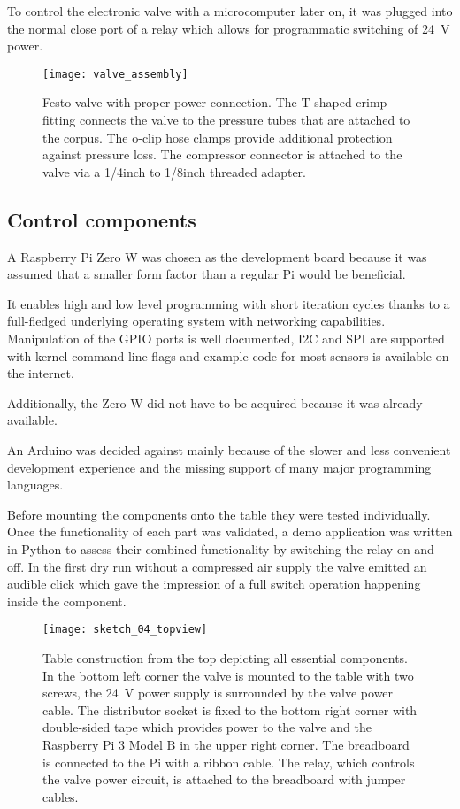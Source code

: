 To control the electronic valve with a microcomputer later on, it was plugged into the normal close port of a relay which allows for programmatic switching of \SI{24}{\volt} power. 

\begin{figure}[H]
\centering

\texttt{[image: valve\_assembly]}

\caption{Festo valve with proper power connection. The T-shaped crimp fitting connects the valve to the pressure tubes that are attached to the corpus. The o-clip hose clamps provide additional protection against pressure loss. The compressor connector is attached to the valve via a 1/4inch to 1/8inch threaded adapter.}
\end{figure}

\subsection{Control components}
A Raspberry Pi Zero W \cite{raspberry-pi-zero-w} was chosen as the development board because it was assumed that a smaller form factor than a regular Pi would be beneficial. 

It enables high and low level programming with short iteration cycles thanks to a full-fledged underlying operating system \cite{raspbian} with networking capabilities. Manipulation of the GPIO ports is well documented, I2C and SPI are supported with kernel command line flags and example code for most sensors is available on the internet.

Additionally, the Zero W did not have to be acquired because it was already available. 

An Arduino was decided against mainly because of the slower and less convenient development experience and the missing support of many major programming languages. 

Before mounting the components onto the table they were tested individually. Once the functionality of each part was validated, a demo application was written in Python to assess their combined functionality by switching the relay on and off. In the first dry run without a compressed air supply the valve emitted an audible click which gave the impression of a full switch operation happening inside the component.

\begin{figure}[H]
\centering

\texttt{[image: sketch\_04\_topview]}

\caption{Table construction from the top depicting all essential components. In the bottom left corner the valve is mounted to the table with two screws, the \SI{24}{\volt} power supply is surrounded by the valve power cable. The distributor socket is fixed to the bottom right corner with double-sided tape which provides power to the valve and the Raspberry Pi 3 Model B in the upper right corner. The breadboard is connected to the Pi with a ribbon cable. The relay, which controls the valve power circuit, is attached to the breadboard with jumper cables.}
\end{figure}


